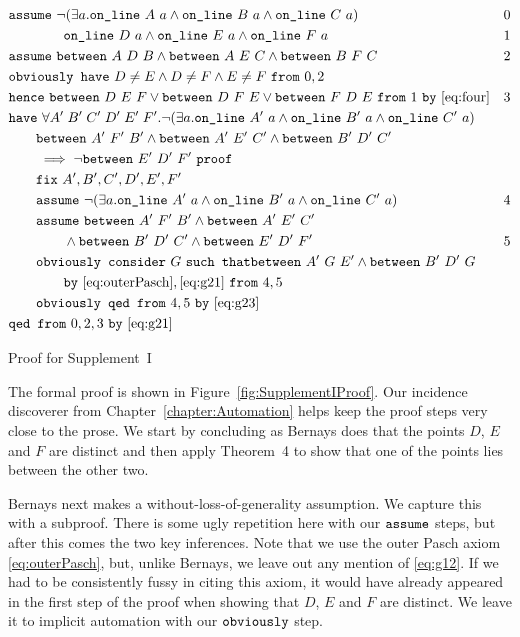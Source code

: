 \begin{boxedfigure}
  \begin{align*}
    &\code{assume}\ \Triangle{a}{A}{B}{C} & 0\\
    &\qquad\qquad \code{on\_line}\ D\ a \wedge \code{on\_line}\ E\ a \wedge \code{on\_line}\ F\ a & 1\\
    &\code{assume}\ \between{A}{D}{B} \wedge \between{A}{E}{C} \wedge \between{B}{F}{C} & 2\\
    &\code{obviously have}\ D\neq E \wedge D\neq F \wedge E\neq F\ \code{from}\ 0,2\\
    &\code{hence}\ \between{D}{E}{F}\vee\between{D}{F}{E}\vee\between{F}{D}{E}\ \code{from}\ 1\ \code{by} \ \eqref{eq:four}&3\\
    &\code{have}\ \forall A'\;B'\;C'\;D'\;E'\;F'. \Triangle{a}{A'}{B'}{C'}\\
    &\qquad \between{A'}{F'}{B'} \wedge \between{A'}{E'}{C'} \wedge \between{B'}{D'}{C'}\\
    &\qquad \implies \neg\between{E'}{D'}{F'}\ \code{proof}\\
    &\qquad \code{fix}\ A',B',C',D',E',F'\\
    &\qquad \code{assume}\ \Triangle{a}{A'}{B'}{C'} & 4\\
    &\qquad \code{assume}\ \between{A'}{F'}{B'} \wedge \between{A'}{E'}{C'}\\ &\qquad\qquad\wedge\between{B'}{D'}{C'}\wedge\between{E'}{D'}{F'} & 5\\
    &\qquad\code{obviously consider}\ G\ \code{such that}\between{A'}{G}{E'} \wedge \between{B'}{D'}{G}\\
    &\qquad\qquad\code{by}\ \eqref{eq:outerPasch},\eqref{eq:g21}\ \code{from}\ 4,5\\
    &\qquad\code{obviously qed from}\ 4,5\ \code{by}\ \eqref{eq:g23}\\
    &\code{qed from}\ 0,2,3\ \code{by}\ \eqref{eq:g21}
  \end{align*}
  \caption{Proof for Supplement~I}
  \label{fig:SupplementIProof}
\end{boxedfigure}

The formal proof is shown in Figure~\ref{fig:SupplementIProof}. Our incidence discoverer from Chapter~\ref{chapter:Automation} helps keep the proof steps very close to the prose. We start by concluding as Bernays does that the points $D$, $E$ and $F$ are distinct and then apply Theorem~4 to show that one of the points lies between the other two.

Bernays next makes a without-loss-of-generality assumption. We capture this with a subproof. There is some ugly repetition here with our $\texttt{assume}$ steps, but after this comes the two key inferences. Note that we use the outer Pasch axiom \eqref{eq:outerPasch}, but, unlike Bernays, we leave out any mention of \eqref{eq:g12}. If we had to be consistently fussy in citing this axiom, it would have already appeared in the first step of the proof when showing that $D$, $E$ and $F$ are distinct. We leave it to implicit automation with our $\texttt{obviously}$ step.

